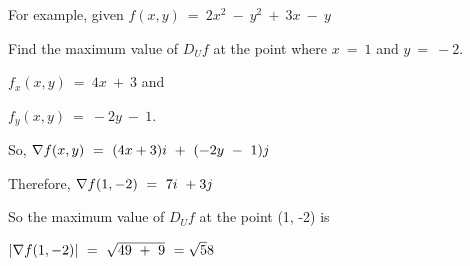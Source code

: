 	For example, given $f(x,y)\ = \ 2x^2\ - \ y^2\ +\  3x\ -\  y$

	Find the maximum value of $D_Uf$ at the point where $x \ = \ 1$ and $y \
= \ -2$.

	$f_x(x,y)\ = \ 4x\ + \ 3$ and 

        $f_y(x,y)\ = \ -2y\ - \ 1$. 

	So, 
        ${\bf \nabla}f(x,y) \ = \ (4x + 3)i \ + \ (-2y \ - \ 1)j$

	Therefore,  
        ${\bf \nabla}f(1,-2)\ = \ 7i\ + 3j$

	So the maximum value of $D_Uf$ at the point (1, -2) is

	$|{\bf \nabla}f(1,-2)|\ = \ \sqrt{49\ + \ 9}\ = \sqrt58$


